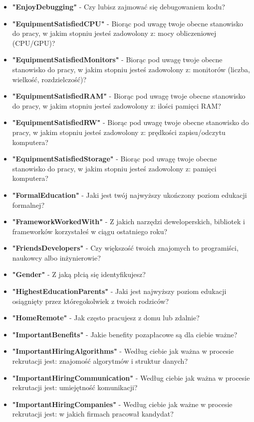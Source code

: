 \begin{appendices}
\begin{itemize}
        \item \textbf{"EnjoyDebugging"} - Czy lubisz zajmować się debugowaniem kodu?
        \item \textbf{"EquipmentSatisfiedCPU"} - Biorąc pod uwagę twoje obecne stanowisko do pracy, w jakim stopniu jesteś zadowolony z: mocy obliczeniowej (CPU/GPU)?
        \item \textbf{"EquipmentSatisfiedMonitors"} - Biorąc pod uwagę twoje obecne stanowisko do pracy, w jakim stopniu jesteś zadowolony z: monitorów (liczba, wielkość, rozdzielczość)?
        \item \textbf{"EquipmentSatisfiedRAM"} - Biorąc pod uwagę twoje obecne stanowisko do pracy, w jakim stopniu jesteś zadowolony z: ilości pamięci RAM?
        \item \textbf{"EquipmentSatisfiedRW"} - Biorąc pod uwagę twoje obecne stanowisko do pracy, w jakim stopniu jesteś zadowolony z: prędkości zapisu/odczytu komputera?
        \item \textbf{"EquipmentSatisfiedStorage"} - Biorąc pod uwagę twoje obecne stanowisko do pracy, w jakim stopniu jesteś zadowolony z: pamięci komputera?
        \item \textbf{"FormalEducation"} - Jaki jest twój najwyższy ukończony poziom edukacji formalnej?
        \item \textbf{"FrameworkWorkedWith"} - Z jakich narzędzi deweloperskich, bibliotek i frameworków korzystałeś w ciągu ostatniego roku?
        \item \textbf{"FriendsDevelopers"} - Czy większość twoich znajomych to programiści, naukowcy albo inżynierowie?
        \item \textbf{"Gender"} - Z jaką płcią się identyfikujesz?
        \item \textbf{"HighestEducationParents"} - Jaki jest najwyższy poziom edukacji osiągnięty przez któregokolwiek z twoich rodziców?
        \item \textbf{"HomeRemote"} - Jak często pracujesz z domu lub zdalnie?
        \item \textbf{"ImportantBenefits"} - Jakie benefity pozapłacowe są dla ciebie ważne?
        \item \textbf{"ImportantHiringAlgorithms"} - Według ciebie jak ważna w procesie rekrutacji jest: znajomość algorytmów i struktur danych?
        \item \textbf{"ImportantHiringCommunication"} - Według ciebie jak ważna w procesie rekrutacji jest: umiejętność komunikacji?
        \item \textbf{"ImportantHiringCompanies"} - Według ciebie jak ważne w procesie rekrutacji jest: w jakich firmach pracował kandydat?

\end{itemize}
\end{appendices}
